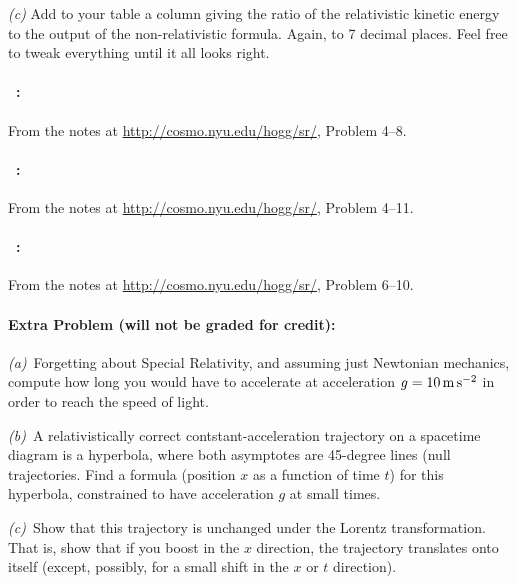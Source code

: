 \documentclass[12pt]{article}
\begin{document}
\textsl{(c)} Add to your table a column giving the ratio of the
relativistic kinetic energy to the output of the non-relativistic
formula. Again, to 7 decimal places. Feel free to tweak everything until it all looks right.

\paragraph{\problemname~\theproblem:}%
From the notes at \url{http://cosmo.nyu.edu/hogg/sr/},
Problem 4--8.

\paragraph{\problemname~\theproblem:}%
From the notes at \url{http://cosmo.nyu.edu/hogg/sr/},
Problem 4--11.

\paragraph{\problemname~\theproblem:}%
From the notes at \url{http://cosmo.nyu.edu/hogg/sr/},
Problem 6--10.

\paragraph{Extra Problem (will not be graded for credit):}%
\textsl{(a)}~Forgetting about Special Relativity, and assuming just
Newtonian mechanics, compute how long you would have to accelerate at
acceleration $g=10\,\mathrm{m}\,\mathrm{s}^{-2}$ in order to reach the speed of light.

\textsl{(b)}~A relativistically correct contstant-acceleration
trajectory on a spacetime diagram is a hyperbola, where both
asymptotes are 45-degree lines (null trajectories. Find a formula
(position $x$ as a function of time $t$) for this hyperbola,
constrained to have acceleration $g$ at small times.

\textsl{(c)}~Show that this trajectory is unchanged under the Lorentz
transformation. That is, show that if you boost in the $x$ direction,
the trajectory translates onto itself (except, possibly, for a small
shift in the $x$ or $t$ direction).
\end{document}
